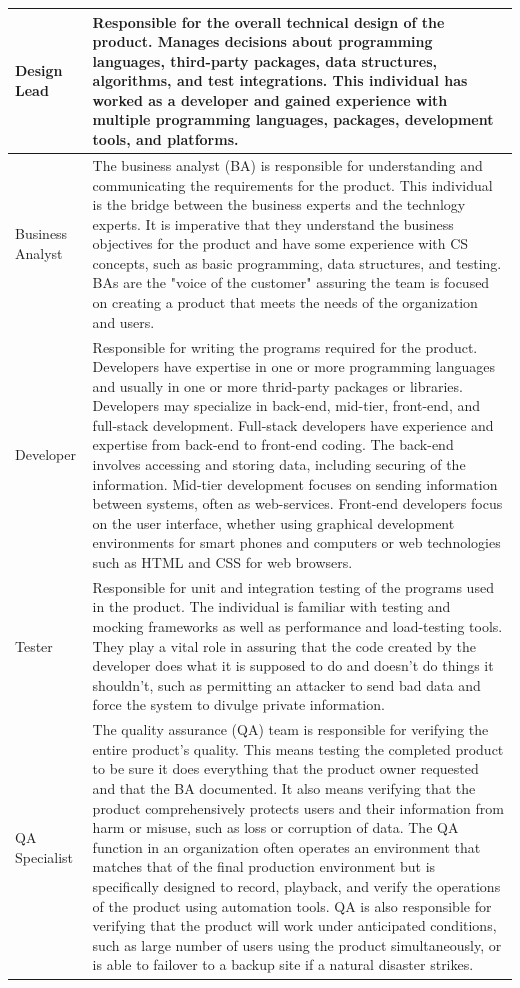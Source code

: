 \begin{longtable}[!htb]{p{.8in}|p{3.6in}}
	\hline
	\Tstrut Design Lead & Responsible for the overall technical design of the product. Manages decisions about programming languages, third-party packages, data structures, algorithms, and test integrations. This individual has worked as a developer and gained experience with multiple programming languages, packages, development tools, and platforms.\\
	\hline
	\Tstrut Business Analyst & The business analyst (BA) is responsible for understanding and communicating the requirements for the product. This individual is the bridge between the business experts and the technlogy experts. It is imperative that they understand the business objectives for the product and have some experience with CS concepts, such as basic programming, data structures, and testing. BAs are the "voice of the customer" assuring the team is focused on creating a product that meets the needs of the organization and users.\\
	\hline
	\Tstrut Developer & Responsible for writing the programs required for the product. Developers have expertise in one or more programming languages and usually in one or more thrid-party packages or libraries. Developers may specialize in back-end, mid-tier, front-end, and full-stack development. Full-stack developers have experience and expertise from back-end to front-end coding. The back-end involves accessing and storing data, including securing of the information. Mid-tier development focuses on sending information between systems, often as web-services. Front-end developers focus on the user interface, whether using graphical development environments for smart phones and computers or web technologies such as HTML and CSS for web browsers.\\
	\hline
	\Tstrut Tester & Responsible for unit and integration testing of the programs used in the product. The individual is familiar with testing and mocking frameworks as well as performance and load-testing tools. They play a vital role in assuring that the code created by the developer does what it is supposed to do and doesn't do things it shouldn't, such as permitting an attacker to send bad data and force the system to divulge private information.\\
	\hline
	\Tstrut QA \linebreak Specialist & The quality assurance (QA) team is responsible for verifying the entire product's quality. This means testing the completed product to be sure it does everything that the product owner requested and that the BA documented. It also means verifying that the product comprehensively protects users and their information from harm or misuse, such as loss or corruption of data. The QA function in an organization often operates an environment that matches that of the final production environment but is specifically designed to record, playback, and verify the operations of the product using automation tools. QA is also responsible for verifying that the product will work under anticipated conditions, such as large number of users using the product simultaneously, or is able to failover to a backup site if a natural disaster strikes.\\

\end{longtable}
